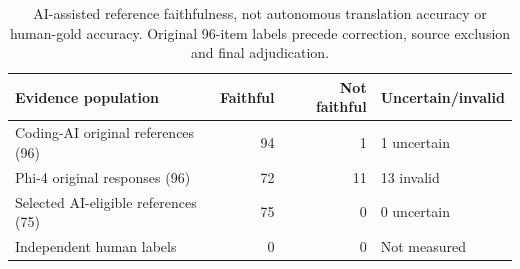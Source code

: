 \begin{table}[t]
\centering
\caption{AI-assisted reference faithfulness, not autonomous translation accuracy or human-gold accuracy. Original 96-item labels precede correction, source exclusion and final adjudication.}
\label{tab:semantic}
\small
\begin{tabular}{lrrl}
\toprule
Evidence population & Faithful & Not faithful & Uncertain/invalid \\
\midrule
Coding-AI original references (96) & 94 & 1 & 1 uncertain \\
Phi-4 original responses (96) & 72 & 11 & 13 invalid \\
Selected AI-eligible references (75) & 75 & 0 & 0 uncertain \\
Independent human labels & 0 & 0 & Not measured \\
\bottomrule
\end{tabular}
\end{table}
